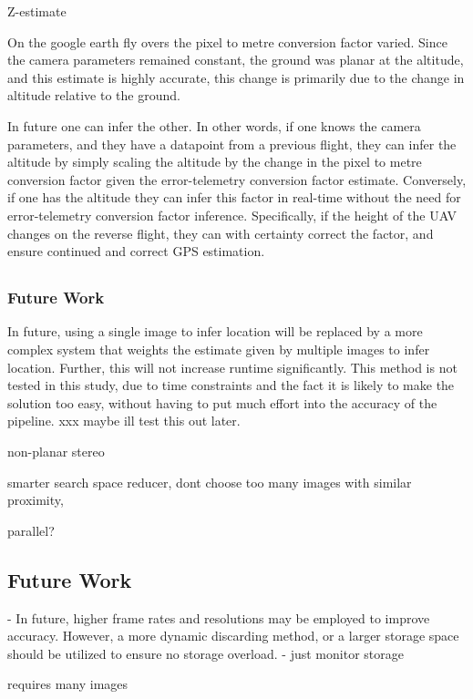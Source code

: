 Z-estimate

On the google earth fly overs the pixel to metre conversion factor varied. 
Since the camera parameters remained constant, the ground was planar at the altitude, and this estimate is highly accurate, this change is primarily due to the change in altitude relative to the ground. 

In future one can infer the other. In other words, if one knows the camera parameters, and they have a datapoint from a previous flight, they can infer the altitude by simply scaling the altitude by the change in the pixel to metre conversion factor given the error-telemetry conversion factor estimate.
Conversely, if one has the altitude they can infer this factor in real-time without the need for error-telemetry conversion factor inference. Specifically, if the height of the UAV changes on the reverse flight, they can with certainty correct the factor, and ensure continued and correct GPS estimation. 




\subsection*{}

\subsubsection*{Future Work}
In future, using a single image to infer location will be replaced by a more complex system that weights the estimate given by multiple images to infer location. Further, this will not increase runtime significantly. This method is not tested in this study, due to time constraints and the fact it is likely to make the solution too easy, without having to put much effort into the accuracy of the pipeline. xxx maybe ill test this out later. 

non-planar stereo 


smarter search space reducer, dont choose too many images with similar proximity, 


parallel?



\subsection*{Future Work}
- In future, higher frame rates and resolutions may be employed to improve accuracy. However, a more dynamic discarding method, or a larger storage space should be utilized to ensure no storage overload. - just monitor storage



requires many images
